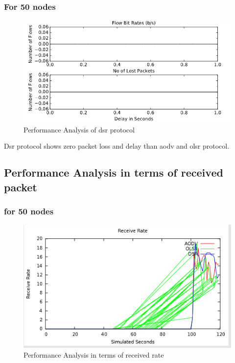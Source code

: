 \documentclass[12pt,a4paper]{report}
\begin{document}
\subsubsection{For 50 nodes}

\begin{figure}[hbtp]
\centering
\includegraphics[scale=.7]{dsr1.png}
\caption{Performance Analysis of dsr protocol}
\end{figure}

Dsr protocol shows zero packet loss and delay than aodv and olsr protocol.


\subsection{Performance Analysis in terms of received packet}
\subsubsection{for 50 nodes}
\begin{figure}[hbtp]
\centering
\includegraphics[scale=.7]{packet1.png}
\caption{Performance Analysis in terms of received rate}
\end{figure}
\end{document}
